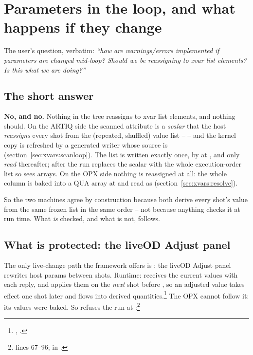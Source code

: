 \section{Parameters in the loop, and what happens if they change}
\label{sec:midloop}

The user's question, verbatim: \emph{``how are warnings/errors implemented if
parameters are changed mid-loop? Should we be reassigning to xvar list
elements? Is this what we are doing?''}

\subsection{The short answer}

\textbf{No, and no.} Nothing in the tree reassigns to xvar list elements, and
nothing should. On the ARTIQ side the scanned attribute  is
a \emph{scalar} that the host \emph{reassigns} every shot from the (repeated,
shuffled) value list --  -- and the kernel copy is refreshed by a generated
writer whose source is 
(section~\ref{sec:xvars:scanloop}). The list  is written
exactly once, by  at , and only
\emph{read} thereafter; after the run  replaces the
scalar with the whole execution-order list so  sees arrays.
On the OPX side nothing is reassigned at all: the whole column is baked into
a QUA array at  and read as 
(section~\ref{sec:xvars:resolve}).

So the two machines agree by construction because both derive every shot's
value from the same frozen list in the same order -- not because anything
checks it at run time. What \emph{is} checked, and what is not, follows.

\subsection{What is protected: the liveOD Adjust panel}
\label{sec:midloop:adjust}

The only live-change path the framework offers is : the liveOD
Adjust panel rewrites host params between shots. Runtime:
 receives the current values with each
 reply, and  applies them
on the \emph{next} shot before , so an adjusted value
takes effect one shot later and flows into derived quantities.\footnote{
, .} The OPX
cannot follow it: its values were baked. So  refuses the run at :\footnote{
lines 67--96;  in .}

